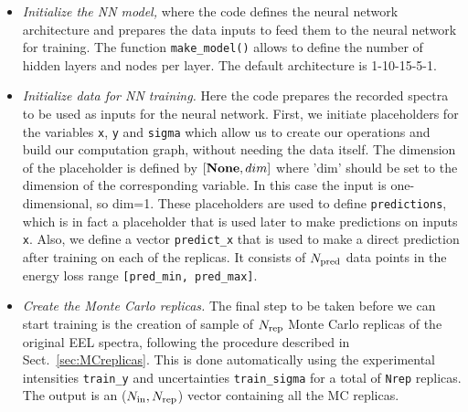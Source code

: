 \begin{itemize}
\item {\it Initialize the NN model,} where the code
  defines the neural network architecture and prepares the
data inputs to feed them to the neural network for training. 
%
The function {\tt make\_model()} allows to define the number of hidden layers and 
nodes per layer. The default  architecture is 1-10-15-5-1.

\item {\it Initialize data for NN training.}
  Here the code prepares the recorded spectra to be used
as inputs for the neural network. 
%
First, we initiate placeholders for the variables
{\tt x}, {\tt y} and {\tt sigma} which
allow us to create our operations and 
build our computation graph, without needing the data itself. 
%
The dimension of the placeholder is defined by {\tt $[{\bf None}, dim]$} where 'dim'
should be set to the dimension of the corresponding variable. In this case the input is 
one-dimensional, so dim=1. 
%
These placeholders are used to define {\tt predictions}, which is in fact a placeholder that is used 
later to make predictions on inputs {\tt x}. 
%
Also, we define a vector {\tt predict\_x} that is used to make a direct prediction after training
on each of the replicas. It consists of $N_{\rm pred}$ data points in the energy loss range
{\tt [pred\_min, pred\_max]}. 

\item {\it Create the Monte Carlo replicas.}
  The final step to be taken before we can start training is the creation of
  sample of $N_{\rm rep}$ Monte Carlo replicas of the original EEL spectra,
  following the procedure described in Sect.~\ref{sec:MCreplicas}.
%
This is done automatically using the experimental intensities {\tt train\_y} and uncertainties
{\tt train\_sigma} for a total of {\tt Nrep} replicas. The output is an ($N_{\rm in}, N_{\rm rep}$) 
vector containing all the MC replicas. 


\end{itemize}
